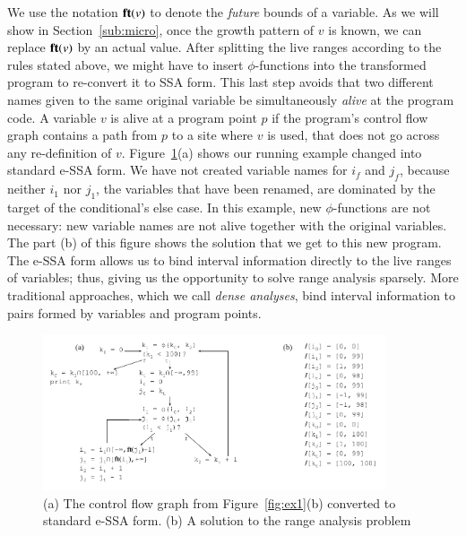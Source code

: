 \documentclass[preprint]{elsarticle}
\newcommand{\fun}[1]{\mbox{\textbf{#1}}}
\begin{document}
We use the notation $\fun{ft}(v)$ to denote the {\em future} bounds of a
variable.
As we will show in Section~\ref{sub:micro}, once the growth pattern of $v$ is
known, we can replace $\fun{ft}(v)$ by an actual value.
After splitting the live ranges according to the rules stated above, we might
have to insert $\phi$-functions into the transformed program to re-convert it to
SSA form.
This last step avoids that two different names given to the same original
variable be simultaneously {\em alive} at the program code.
A variable $v$ is alive at a program point $p$ if the program's control flow
graph contains a path from $p$ to a site where $v$ is used, that does not
go across any re-definition of $v$.
Figure~\ref{fig:ex_standard_eSSA}(a) shows our running example changed into
standard e-SSA form.
We have not created variable names for $i_f$ and $j_f$, because neither
$i_1$ nor $j_1$, the variables that have been renamed, are dominated by the
target of the conditional's else case.
In this example, new $\phi$-functions are not necessary: new variable
names are not alive together with the original variables.
The part (b) of this figure shows the solution that we get to this new
program.
The e-SSA form allows us to bind interval information directly to the live
ranges of variables; thus, giving us the opportunity to solve range analysis
sparsely.
More traditional approaches, which we call {\em dense analyses}, bind
interval information to pairs formed by variables and program points.


\begin{figure}[t!]
\begin{center}
\includegraphics[width=0.9\textwidth]{images/ex_standard_eSSA}
\end{center}
\caption{\label{fig:ex_standard_eSSA}
(a) The control flow graph from Figure~\ref{fig:ex1}(b) converted to standard
e-SSA form.
(b) A solution to the range analysis problem
}
\end{figure}
\end{document}
